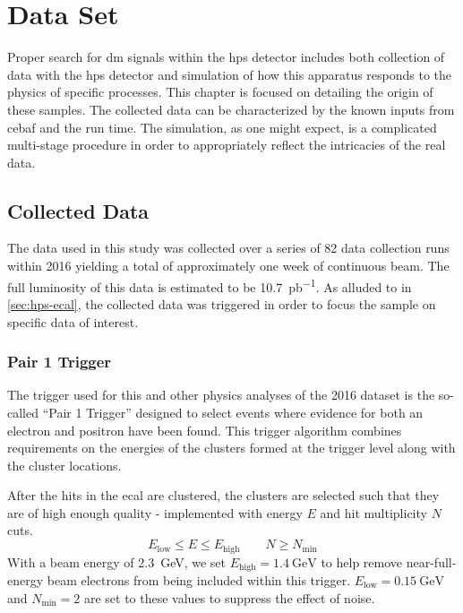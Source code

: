 \chapter{Data Set}
\label{chapter:hps:dataset}

Proper search for \ac{dm} signals within the \ac{hps} detector includes both collection of data
with the \ac{hps} detector and simulation of how this apparatus responds to the physics of specific
processes. This chapter is focused on detailing the origin of these samples. The collected data can
be characterized by the known inputs from \ac{cebaf} and the run time. The simulation, as one might
expect, is a complicated multi-stage procedure in order to appropriately reflect the intricacies of
the real data.

\section{Collected Data} \label{sec:hps:data}
The data used in this study was collected over a series of 82 data collection runs within 2016
yielding a total of approximately one week of continuous beam.
The full luminosity of this data is estimated to be \qty{10.7}{pb^{-1}}.
As alluded to in \cref{sec:hps-ecal}, the collected data was triggered in order to focus the sample on
specific data of interest.

\subsection{Pair 1 Trigger} \label{sec:hps:data:trigger}
The trigger used for this and other physics analyses of the 2016 dataset is the so-called ``Pair 1 Trigger''
designed to select events where evidence for both an electron and positron have been found.
This trigger algorithm combines requirements on the energies of the clusters formed at the trigger
level along with the cluster locations.

After the hits in the \ac{ecal} are clustered, the clusters are selected such that they are of
high enough quality - implemented with energy $E$ and hit multiplicity $N$ cuts.
$$
  E_\mathrm{low} \leq E \leq E_\mathrm{high} \qquad N \geq N_\mathrm{min}
$$
With a beam energy of \qty{2.3}{\GeV}, we set $E_\mathrm{high}=\qty{1.4}{\GeV}$ to help remove
near-full-energy beam electrons from being included within this trigger.
$E_\mathrm{low} = \qty{0.15}{\GeV}$ and $N_\mathrm{min}=2$ are set to these values to suppress
the effect of noise.

